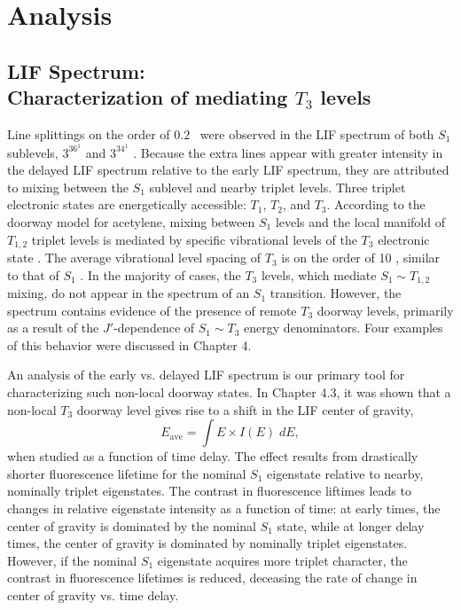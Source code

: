 \documentclass[12pt]{mitthesis}
\begin{document}
\section{Analysis}

\subsection{LIF Spectrum: \\Characterization of mediating $T_3$
  levels}

Line splittings on the order of $0.2$ \rcm\ were observed in the LIF
spectrum of both $S_1$ sublevels, $3^36^1$  and $3^34^1$ .
Because the extra lines appear with greater intensity in the delayed
LIF spectrum relative to the early LIF spectrum, they are attributed
to mixing between the $S_1$ sublevel and nearby triplet levels.  Three
triplet electronic states are energetically accessible: $T_1$, $T_2$,
and $T_3$.  According to the doorway model for acetylene, mixing
between $S_1$ levels and the local manifold of $T_{1,2}$ triplet
levels is mediated by specific vibrational levels of the $T_3$
electronic state .  The average vibrational level spacing
of $T_3$ is on the order of 10 \rcm, similar to that of $S_1$
\cite{thom07}.  In the majority of cases, the $T_3$ levels, which
mediate $S_1 \sim T_{1,2}$ mixing, do not appear in the spectrum of an
$S_1$ transition.  However, the spectrum contains evidence of the
presence of remote $T_3$ doorway levels, primarily as a result of the
$J'$-dependence of $S_1 \sim T_3$ energy denominators.  Four examples
of this behavior were discussed in Chapter 4. 

An analysis of the early vs. delayed LIF spectrum is our primary tool
for characterizing such non-local doorway states.  In Chapter 4.3, it was
shown that a non-local $T_3$ doorway level gives rise to a shift in
the LIF center of gravity,
\begin{equation}
  E_{\text{ave}} = \int E \times I(E) \; dE,
\end{equation}
when studied as a function of time delay.  The effect results from
drastically shorter fluorescence lifetime for the nominal $S_1$
eigenstate relative to nearby, nominally triplet eigenstates.  The
contrast in fluorescence liftimes leads to changes in relative
eigenstate intensity as a function of time: at early times, the center
of gravity is dominated by the nominal $S_1$ state, while at longer
delay times, the center of gravity is dominated by nominally triplet
eigenstates.  However, if the nominal $S_1$ eigenstate acquires more
triplet character, the contrast in fluorescence lifetimes is reduced,
deceasing the rate of change in center of gravity vs. time delay.
\end{document}
